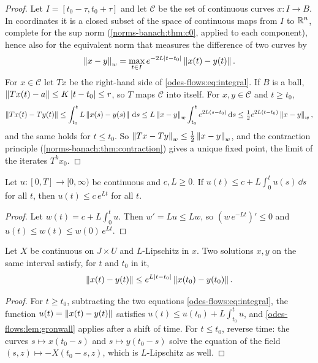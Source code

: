 \begin{notechapter}
\begin{proof}
Let $I = [t_0 - \tau, t_0 + \tau]$ and let $\mathcal C$ be the set of
continuous curves $x:I\to B$. In coordinates it is a closed subset of
the space of continuous maps from $I$ to $\mathbb{R}^n$, complete for the sup
norm (\cref{norms-banach:thm:c0}, applied to each component), hence
also for the equivalent norm that measures the difference of two
curves by
\[
  \left\|x - y\right\|_w
  = \max_{t\in I}e^{-2L\left|t - t_0\right|}\left\|x(t) - y(t)\right\| .
\]
For $x\in\mathcal C$ let $Tx$ be the right-hand side of
\eqref{odes-flows:eq:integral}. If $B$ is a ball,
$\left\|Tx(t) - a\right\|\leq K\left|t - t_0\right|\leq r$, so $T$ maps $\mathcal C$
into itself. For $x, y\in\mathcal C$ and $t\geq t_0$,
\[
  \left\|Tx(t) - Ty(t)\right\|
  \leq\int_{t_0}^tL\left\|x(s) - y(s)\right\|\,\mathrm{d} s
  \leq L\left\|x - y\right\|_w\int_{t_0}^te^{2L(s - t_0)}\,\mathrm{d} s
  \leq\tfrac12e^{2L(t - t_0)}\left\|x - y\right\|_w ,
\]
and the same holds for $t\leq t_0$. So
$\left\|Tx - Ty\right\|_w\leq\frac12\left\|x - y\right\|_w$, and the contraction
principle (\cref{norms-banach:thm:contraction}) gives a unique fixed
point, the limit of the iterates $T^kx_0$.
\end{proof}

\begin{lemma}[Gr\"onwall]\label{odes-flows:lem:gronwall}
Let $u:[0, T]\to[0, \infty)$ be continuous and $c, L\geq0$. If
$u(t)\leq c + L\int_0^tu(s)\,\dd s$ for all $t$, then
$u(t)\leq c\,e^{Lt}$ for all $t$.
\end{lemma}

\begin{proof}
Let $w(t) = c + L\int_0^tu$. Then $w' = Lu\leq Lw$, so
$(w\,e^{-Lt})'\leq0$ and $u(t)\leq w(t)\leq w(0)\,e^{Lt}$.
\end{proof}

\begin{theorem}
\label{odes-flows:thm:dependence}
Let $X$ be continuous on $J\times U$ and $L$-Lipschitz in $x$. Two
solutions $x, y$ on the same interval satisfy, for $t$ and $t_0$ in
it,
\[
  \left\|x(t) - y(t)\right\|\leq e^{L\left|t - t_0\right|}\left\|x(t_0) - y(t_0)\right\| .
\]
\end{theorem}

\begin{proof}
For $t\geq t_0$, subtracting the two equations
\eqref{odes-flows:eq:integral}, the function
$u(t) = \left\|x(t) - y(t)\right\|$ satisfies
$u(t)\leq u(t_0) + L\int_{t_0}^tu$, and \cref{odes-flows:lem:gronwall}
applies after a shift of time. For $t\leq t_0$, reverse time: the
curves $s\mapsto x(t_0 - s)$ and $s\mapsto y(t_0 - s)$ solve the
equation of the field $(s, z)\mapsto-X(t_0 - s, z)$, which is
$L$-Lipschitz as well.
\end{proof}


\end{notechapter}
